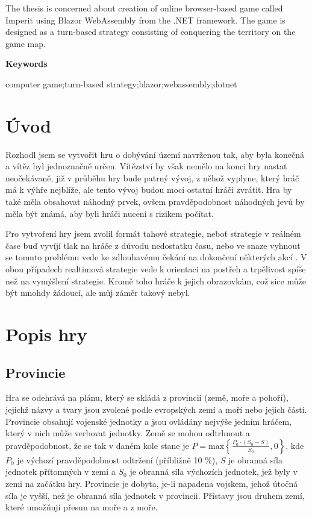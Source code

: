 \documentclass[a4paper,12pt]{article}
\def\max #1{\textrm{max}\left\{#1\right\}}
\begin{document}
The thesis is concerned about creation of online browser-based game called Imperit using Blazor WebAssembly from the .NET framework. The game is designed as a turn-based strategy consisting of conquering the territory on the game map.

\Large\textbf{Keywords}\normalsize

computer game;turn-based strategy;blazor;webassembly;dotnet
\newpage
\thispagestyle{empty}
\tableofcontents
\newpage
\section{Úvod}
Rozhodl jsem se vytvořit hru o dobývání území navrženou tak, aby byla konečná a vítěz byl jednoznačně určen. Vítězství by však nemělo na konci hry nastat neočekávaně, již v průběhu hry bude patrný vývoj, z něhož vyplyne, který hráč má k výhře nejblíže, ale tento vývoj budou moci ostatní hráči zvrátit. Hra by také měla obsahovat náhodný prvek, ovšem pravděpodobnost náhodných jevů by měla být známá, aby byli hráči nuceni s rizikem počítat.

Pro vytvoření hry jsem zvolil formát tahové strategie, neboť strategie v reálném čase buď vyvíjí tlak na hráče z důvodu nedostatku času, nebo ve snaze vyhnout se tomuto problému vede ke zdlouhavému čekání na dokončení některých akcí \cite{turnreal1}. V obou případech realtimová strategie vede k orientaci na postřeh a trpělivost spíše než na vymýšlení strategie\cite{turnreal2}. Kromě toho  hráče k jejich obrazovkám, což sice může být mnohdy žádoucí, ale můj záměr takový nebyl.

\section{Popis hry}
\subsection{Provincie}
Hra se odehrává na plánu, který se skládá z provincií (země, moře a pohoří), jejichž názvy a tvary jsou zvolené podle evropských zemí a moří nebo jejich části. Provincie obsahují vojenské jednotky a jsou ovládány nejvýše jedním hráčem, který v nich může verbovat jednotky. Země se mohou odtrhnout a pravděpodobnost, že se tak v daném kole stane je $P=\max{\displaystyle\frac{P_0\cdot (S_0-S)}{S_0},0}$, kde $P_0$ je výchozí pravděpodobnost odtržení (příbližně 10 \%), $S$ je obranná síla jednotek přítomných v zemi a $S_0$ je obranná síla výchozích jednotek, jež byly v zemi na začátku hry. Provincie je dobyta, je-li napadena vojskem, jehož útočná síla je vyšší, než je obranná síla jednotek v provincii. Přístavy jsou druhem zemí, které umožňují přesun na moře a z moře.
\end{document}
